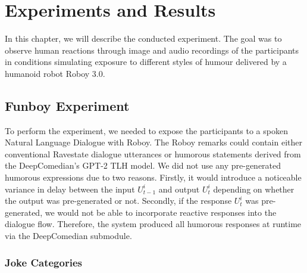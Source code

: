 
\chapter{Experiments and Results}\label{chapter:experiment}
In this chapter, we will describe the conducted experiment. The goal was to observe human reactions through image and audio recordings of the participants in conditions simulating exposure to different styles of humour delivered by a humanoid robot Roboy 3.0.

\section{Funboy Experiment}

To perform the experiment, we needed to expose the participants to a spoken Natural Language Dialogue with Roboy. The Roboy remarks could contain either conventional Ravestate dialogue utterances or humorous statements derived from the DeepComedian’s GPT-2 TLH model. We did not use any pre-generated humorous expressions due to two reasons. Firstly, it would introduce a noticeable variance in delay between the input \( U_{t-1}^i\) and output \( U_t^i\) depending on whether the output was pre-generated or not. Secondly, if the response \( U_t^i\) was pre-generated, we would not be able to incorporate reactive responses into the dialogue flow. Therefore, the system produced all humorous responses at runtime via the DeepComedian submodule. 

\subsection{Joke Categories}\label{section:expjokecat}

